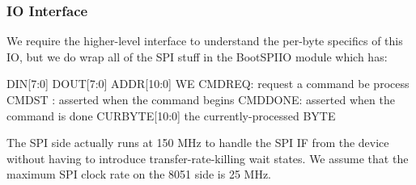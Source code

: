 \subsubsection{IO Interface} 
We require the higher-level interface to understand the per-byte
specifics of this IO, but we do wrap
all of the SPI stuff in the BootSPIIO module which has: 

DIN[7:0]
DOUT[7:0]
ADDR[10:0]
WE 
CMDREQ: request a command be process
CMDST : asserted when the command begins
CMDDONE: asserted when the command is done
CURBYTE[10:0] the currently-processed BYTE

The SPI side actually runs at 150 MHz to handle the SPI IF from the
device without having to introduce transfer-rate-killing wait states.
We assume that the maximum SPI clock rate on the 8051 side is 25 MHz.

